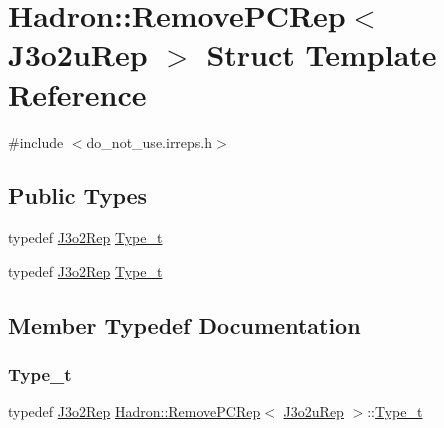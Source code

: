 \hypertarget{structHadron_1_1RemovePCRep_3_01J3o2uRep_01_4}{}\section{Hadron\+:\+:Remove\+P\+C\+Rep$<$ J3o2u\+Rep $>$ Struct Template Reference}
\label{structHadron_1_1RemovePCRep_3_01J3o2uRep_01_4}


{\ttfamily \#include $<$do\+\_\+not\+\_\+use.\+irreps.\+h$>$}

\subsection*{Public Types}
\begin{DoxyCompactItemize}
\item 
typedef \mbox{\hyperlink{structHadron_1_1J3o2Rep}{J3o2\+Rep}} \mbox{\hyperlink{structHadron_1_1RemovePCRep_3_01J3o2uRep_01_4_a589ac9849b0ccd9ee4e8affe500daad5}{Type\+\_\+t}}
\item 
typedef \mbox{\hyperlink{structHadron_1_1J3o2Rep}{J3o2\+Rep}} \mbox{\hyperlink{structHadron_1_1RemovePCRep_3_01J3o2uRep_01_4_a589ac9849b0ccd9ee4e8affe500daad5}{Type\+\_\+t}}
\end{DoxyCompactItemize}


\subsection{Member Typedef Documentation}
\mbox{\label{structHadron_1_1RemovePCRep_3_01J3o2uRep_01_4_a589ac9849b0ccd9ee4e8affe500daad5}} 
\subsubsection{\texorpdfstring{Type\_t}{Type\_t}\hspace{0.1cm}{\footnotesize\ttfamily [1/2]}}
{\footnotesize\ttfamily typedef \mbox{\hyperlink{structHadron_1_1J3o2Rep}{J3o2\+Rep}} \mbox{\hyperlink{structHadron_1_1RemovePCRep}{Hadron\+::\+Remove\+P\+C\+Rep}}$<$ \mbox{\hyperlink{structHadron_1_1J3o2uRep}{J3o2u\+Rep}} $>$\+::\mbox{\hyperlink{structHadron_1_1RemovePCRep_3_01J3o2uRep_01_4_a589ac9849b0ccd9ee4e8affe500daad5}{Type\+\_\+t}}}

